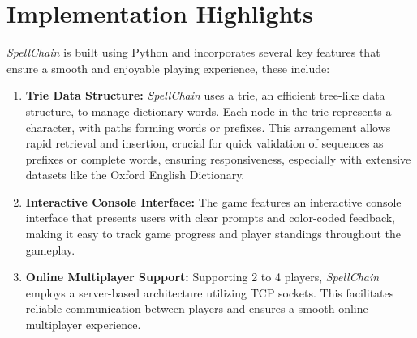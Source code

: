 \documentclass{article}
\begin{document}
\section*{Implementation Highlights}
\textit{SpellChain} is built using Python and incorporates several key features that ensure a smooth and enjoyable playing experience, these include:
\begin{enumerate}
    \item \textbf{Trie Data Structure:} \textit{SpellChain} uses a trie, an efficient tree-like data structure, to manage dictionary words. Each node in the trie represents a character, with paths forming words or prefixes. This arrangement allows rapid retrieval and insertion, crucial for quick validation of sequences as prefixes or complete words, ensuring responsiveness, especially with extensive datasets like the Oxford English Dictionary.
    \item \textbf{Interactive Console Interface:} The game  features an interactive console interface that presents users with clear prompts and color-coded feedback, making it easy to track game progress and player standings throughout the gameplay.
    \item \textbf{Online Multiplayer Support:} Supporting 2 to 4 players, \textit{SpellChain} employs a server-based architecture utilizing TCP sockets. This facilitates reliable communication between players and ensures a smooth online multiplayer experience.
\end{enumerate}
\end{document}
